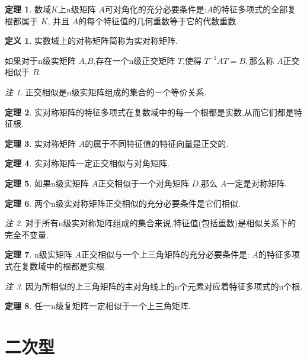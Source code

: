 \documentclass[a4paper,11pt]{article}%
\theoremstyle{remark}
\newtheorem*{remark}{注}
\theoremstyle{definition}
\newtheorem{theorem}{定理}[section]
\theoremstyle{definition}
\newtheorem*{definition}{定义}
\theoremstyle{plain}
\begin{document}
\begin{theorem}
    数域$K$上n级矩阵 $A$可对角化的充分必要条件是:$A$的特征多项式的全部复根都属于 $K$,
    并且 $A$的每个特征值的几何重数等于它的代数重数.
\end{theorem}
\begin{definition}
    实数域上的对称矩阵简称为实对称矩阵.

    如果对于n级实矩阵 $A$,$B$,存在一个n级正交矩阵 $T$,使得 $T^{-1}AT=B,$那么称 $A$正交相似于 $B$.
\end{definition}
\begin{remark}
    正交相似是n级实矩阵组成的集合的一个等价关系.
\end{remark}
\begin{theorem}
    实对称矩阵的特征多项式在复数域中的每一个根都是实数,从而它们都是特征根.
\end{theorem}
\begin{theorem}
    实对称矩阵 $A$的属于不同特征值的特征向量是正交的.
\end{theorem}
\begin{theorem}
    实对称矩阵一定正交相似与对角矩阵.
\end{theorem}
\begin{theorem}
    如果n级实矩阵 $A$正交相似于一个对角矩阵 $D$,那么 $A$一定是对称矩阵.
\end{theorem}
\begin{theorem}
    两个n级实对称矩阵正交相似的充分必要条件是它们相似.
\end{theorem}
\begin{remark}
    对于所有n级实对称矩阵组成的集合来说,特征值(包括重数)是相似关系下的完全不变量.
\end{remark}
\begin{theorem}
    n级实矩阵 $A$正交相似与一个上三角矩阵的充分必要条件是: $A$的特征多项式在复数域中的根都是实根.
\end{theorem}
\begin{remark}
    因为所相似的上三角矩阵的主对角线上的n个元素对应着特征多项式的n个根.
\end{remark}

\begin{theorem}
    任一n级复矩阵一定相似于一个上三角矩阵.
\end{theorem}
\section{二次型}
\end{document}
